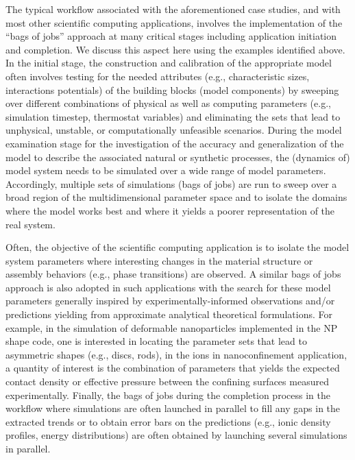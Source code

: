 The typical workflow associated with the aforementioned case studies, and with most other scientific computing applications, involves the implementation of the ``bags of jobs'' approach at many critical stages including application initiation and completion. We discuss this aspect here using the examples identified above. In the initial stage, the construction and calibration of the appropriate model often involves testing for the needed attributes (e.g., characteristic sizes, interactions potentials) of the building blocks (model components) by sweeping over different combinations of physical as well as computing parameters (e.g., simulation timestep, thermostat variables) and eliminating the sets that lead to unphysical, unstable, or computationally unfeasible scenarios. During the model examination stage for the investigation of the accuracy and generalization of the model to describe the associated natural or synthetic processes, the (dynamics of) model system needs to be simulated over a wide range of model parameters. Accordingly, multiple sets of simulations (bags of jobs) are run to sweep over a broad region of the multidimensional parameter space and to isolate the domains where the model works best and where it yields a poorer representation of the real system. 

Often, the objective of the scientific computing application is to isolate the model system parameters where interesting changes in the material structure or assembly behaviors (e.g., phase transitions) are observed. A similar bags of jobs approach is also  adopted in such applications with the search for these model parameters generally inspired by experimentally-informed observations and/or predictions yielding from approximate analytical theoretical formulations. For example, in the simulation of deformable nanoparticles implemented in the NP shape code, one is interested in locating the parameter sets that lead to asymmetric shapes (e.g., discs, rods), in the ions in nanoconfinement application, a quantity of interest is the combination of parameters that yields the expected contact density or effective pressure between the confining surfaces measured experimentally. Finally, the bags of jobs during the completion process in the workflow where simulations are often launched in parallel to fill any gaps in the extracted trends or to obtain error bars on the predictions (e.g., ionic density profiles, energy distributions) are often obtained by launching several simulations in parallel.


\begin{comment}

- sweep, to get parameter set suitable
- important part of workflow
- exploring 
- ML ICCS application, training the ML model, new trend
- critical to develop ML wrappers for simulations on HPC
- ML IJHPCA

\end{comment}


